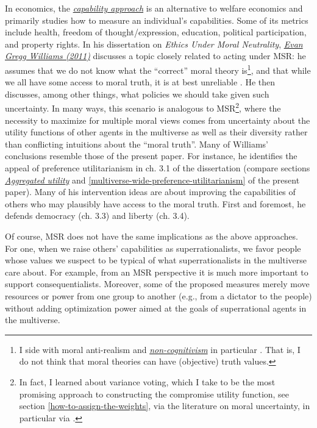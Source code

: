 In economics, the
\href{https://en.wikipedia.org/wiki/Capability_approach}{\emph{capability
approach}} is an alternative to welfare economics and primarily studies
how to measure an individual's capabilities. Some of its metrics include
health, freedom of thought/expression, education, political
participation, and property rights. In his dissertation on \emph{Ethics
Under Moral Neutrality},
\href{https://rucore.libraries.rutgers.edu/rutgers-lib/34078/pdf/1/}{\emph{Evan
Gregg Williams (2011)}} discusses a topic closely related to acting
under MSR: he assumes that we do not know what the ``correct'' moral
theory is\footnote{\label{non-cognitivism} I side with moral anti-realism
  \parencite{Joyce2016-no} and
  \href{https://en.wikipedia.org/wiki/Non-cognitivism}{\emph{non-cognitivism}}
  in particular \parencite{Joyce2016-no}. That is, I do not
  think that moral theories can have (objective) truth values.}, and
that while we all have some access to moral truth, it is at best
unreliable \parencite{Williams2011-ul}. He then discusses,
among other things, what policies we should take given such uncertainty.
In many ways, this scenario is analogous to MSR\footnote{In fact, I
  learned about variance voting, which I take to be the most promising
  approach to constructing the compromise utility function, see section
  \ref{how-to-assign-the-weights}, via the literature on moral uncertainty, in
  particular via \parencite{MacAskill2014-ca}.}, where the
necessity to maximize for multiple moral views comes from uncertainty
about the utility functions of other agents in the multiverse as well as
their diversity rather than conflicting intuitions about the ``moral
truth''. Many of Williams' conclusions resemble those of the present
paper. For instance, he identifies the appeal of preference
utilitarianism in ch. 3.1 of the dissertation (compare sections
\protect\hyperlink{_2uwv44pwn55u}{\emph{Aggregated utility}} and
\ref{multiverse-wide-preference-utilitarianism} of the present paper). Many of his
intervention ideas are about improving the capabilities of others who
may plausibly have access to the moral truth. First and foremost, he
defends democracy (ch. 3.3) and liberty (ch. 3.4).

Of course, MSR does not have the same implications as the above
approaches. For one, when we raise others' capabilities as
superrationalists, we favor people whose values we suspect to be typical
of what superrationalists in the multiverse care about. For example,
from an MSR perspective it is much more important to support
consequentialists. Moreover, some of the proposed measures merely move
resources or power from one group to another (e.g., from a dictator to
the people) without adding optimization power aimed at the goals of
superrational agents in the multiverse.

